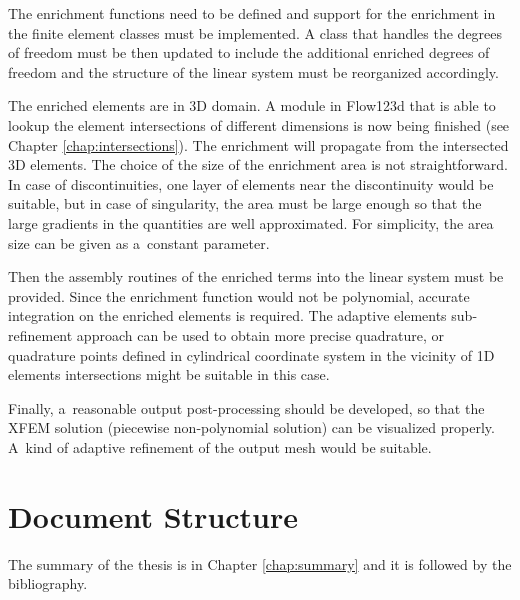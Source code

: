 The enrichment functions need to be defined and support for the enrichment in the finite element classes must be implemented. 
A class that handles the degrees of freedom must be then updated to include the additional enriched degrees of freedom
and the structure of the linear system must be reorganized accordingly.

The enriched elements are in 3D domain. A module in Flow123d that is able to lookup the element intersections
of different dimensions is now being finished (see Chapter \ref{chap:intersections}). The enrichment will propagate from the intersected 3D elements.
The choice of the size of the enrichment area is not straightforward. In case of discontinuities, one layer of elements
near the discontinuity would be suitable, but in case of singularity, the area must be large enough so that 
the large gradients in the quantities are well approximated. For simplicity, the area size can be given as
a~constant parameter.

Then the assembly routines of the enriched terms into the linear system must be provided.
Since the enrichment function would not be polynomial, accurate integration on the enriched elements is required. 
The adaptive elements sub-refinement approach can be used to obtain more precise quadrature, 
or quadrature points defined in cylindrical coordinate system in the vicinity of 1D elements intersections
might be suitable in this case.

Finally, a~reasonable output post-processing should be developed, so that the XFEM solution (piecewise non-polynomial solution)
can be visualized properly. A~kind of adaptive refinement of the output mesh would be suitable.


\section{Document Structure} \label{sec:structure}

% 
% 

The summary of the thesis is in Chapter \ref{chap:summary} and it is followed by the bibliography.













